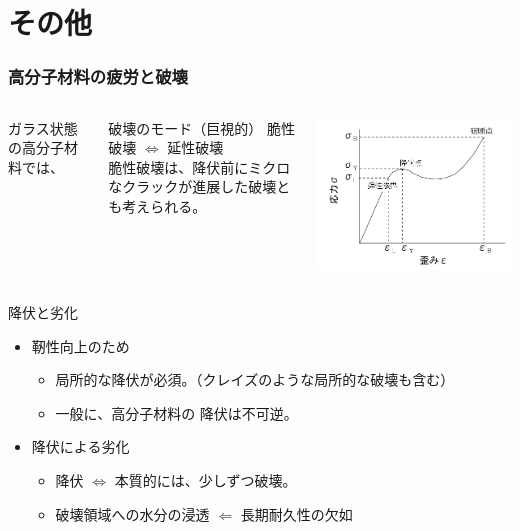 \documentclass[11pt, dvipdfmx]{beamer}
\begin{document}
\section{その他}
\begin{frame}
\frametitle{高分子材料の疲労と破壊}
\begin{columns}[totalwidth=1\textwidth]
ガラス状態の高分子材料では、
\begin{block}{破壊のモード（巨視的）}
脆性破壊 $\Leftrightarrow$ 延性破壊\\
脆性破壊は、降伏前にミクロなクラックが進展した破壊とも考えられる。
\end{block}
	\centering
	\includegraphics[width=\textwidth]{./fig/S_S_Curve.png}
\end{columns}
\begin{exampleblock}{降伏と劣化}
	\begin{itemize}
	\item
	靭性向上のため
	\begin{itemize}
		\item
		{\color{red} 局所的な降伏}が必須。（クレイズのような局所的な破壊も含む）
		\item 
		一般に、高分子材料の{\color{red} 降伏は不可逆}。
	\end{itemize}
	\item
	降伏による劣化
		\begin{itemize}
			\item 
			降伏 $\Leftrightarrow$ {\color{red} 本質的には、少しずつ破壊。}
			\item
			{\color{red} 破壊領域への水分の浸透 $\Leftarrow$ 長期耐久性の欠如}
		\end{itemize}
	\end{itemize}
\end{exampleblock}
\end{frame}
\end{document}
